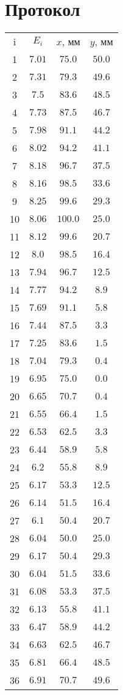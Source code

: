\section*{Протокол}

\begin{tabular}{cccc}
	i & $ E_i  $ & $ x $, мм & $ y $, мм \\
	1 & $ 7.01 $ & $ 75.0 $ & $ 50.0 $ \\
	2 & $ 7.31 $ & $ 79.3 $ & $ 49.6 $ \\
	3 & $ 7.5 $ & $ 83.6 $ & $ 48.5 $ \\
	4 & $ 7.73 $ & $ 87.5 $ & $ 46.7 $ \\
	5 & $ 7.98 $ & $ 91.1 $ & $ 44.2 $ \\
	6 & $ 8.02 $ & $ 94.2 $ & $ 41.1 $ \\
	7 & $ 8.18 $ & $ 96.7 $ & $ 37.5 $ \\
	8 & $ 8.16 $ & $ 98.5 $ & $ 33.6 $ \\
	9 & $ 8.25 $ & $ 99.6 $ & $ 29.3 $ \\
	10 & $ 8.06 $ & $ 100.0 $ & $ 25.0 $ \\
	11 & $ 8.12 $ & $ 99.6 $ & $ 20.7 $ \\
	12 & $ 8.0 $ & $ 98.5 $ & $ 16.4 $ \\
	13 & $ 7.94 $ & $ 96.7 $ & $ 12.5 $ \\
	14 & $ 7.77 $ & $ 94.2 $ & $ 8.9 $ \\
	15 & $ 7.69 $ & $ 91.1 $ & $ 5.8 $ \\
	16 & $ 7.44 $ & $ 87.5 $ & $ 3.3 $ \\
	17 & $ 7.25 $ & $ 83.6 $ & $ 1.5 $ \\
	18 & $ 7.04 $ & $ 79.3 $ & $ 0.4 $ \\
	19 & $ 6.95 $ & $ 75.0 $ & $ 0.0 $ \\
	20 & $ 6.65 $ & $ 70.7 $ & $ 0.4 $ \\
	21 & $ 6.55 $ & $ 66.4 $ & $ 1.5 $ \\
	22 & $ 6.53 $ & $ 62.5 $ & $ 3.3 $ \\
	23 & $ 6.44 $ & $ 58.9 $ & $ 5.8 $ \\
	24 & $ 6.2 $ & $ 55.8 $ & $ 8.9 $ \\
	25 & $ 6.17 $ & $ 53.3 $ & $ 12.5 $ \\
	26 & $ 6.14 $ & $ 51.5 $ & $ 16.4 $ \\
	27 & $ 6.1 $ & $ 50.4 $ & $ 20.7 $ \\
	28 & $ 6.04 $ & $ 50.0 $ & $ 25.0 $ \\
	29 & $ 6.17 $ & $ 50.4 $ & $ 29.3 $ \\
	30 & $ 6.04 $ & $ 51.5 $ & $ 33.6 $ \\
	31 & $ 6.08 $ & $ 53.3 $ & $ 37.5 $ \\
	32 & $ 6.13 $ & $ 55.8 $ & $ 41.1 $ \\
	33 & $ 6.47 $ & $ 58.9 $ & $ 44.2 $ \\
	34 & $ 6.63 $ & $ 62.5 $ & $ 46.7 $ \\
	35 & $ 6.81 $ & $ 66.4 $ & $ 48.5 $ \\
	36 & $ 6.91 $ & $ 70.7 $ & $ 49.6 $ \\
\end{tabular}
